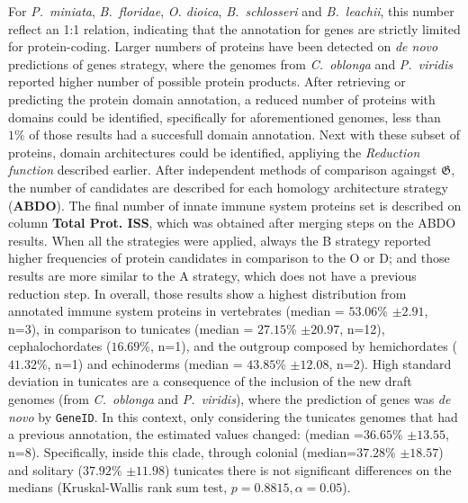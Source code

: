 \documentclass[11pt]{article}
\newcommand{\CAVH}[1]{\begingroup\color{green}#1\endgroup}
\begin{document}
For \textit{P.\ miniata}, \textit{B.\ floridae}, \textit{O. dioica}, 
\textit{B.\ schlosseri} and \textit{B.\ leachii}, this number reflect an 1:1 relation, indicating
that the annotation for genes are strictly limited for protein-coding. Larger numbers of 
proteins have been detected on \textit{de novo} predictions of genes strategy, where the genomes 
from \textit{C.\ oblonga} and \textit{P.\ viridis} reported higher number of possible protein
products. After retrieving or predicting the protein domain annotation, a reduced number of 
proteins with domains could be identified, specifically for aforementioned genomes, less than
$1\%$ of those results had a succesfull domain annotation. Next with these subset of proteins,
domain architectures could be identified, appliying the \textsl{Reduction function} described 
earlier. After independent methods of comparison againgst $\boldsymbol{\mathfrak{G}}$, the 
number of candidates are described for each homology architecture strategy (\textbf{ABDO}).
The final number of innate immune system proteins set is described on column \textbf{Total Prot. 
ISS}, which was obtained after merging steps on the ABDO results. 
When all the strategies were applied, always the B strategy reported higher 
frequencies of protein candidates in comparison to the O or D; and those 
results are more similar to the A strategy, which does not have a previous 
reduction step. In overall, those results show a highest distribution from 
annotated immune system proteins in vertebrates (median = $53.06$\% $\pm 
2.91$, n=3), in comparison to tunicates (median = $27.15$\% $\pm 20.97$, n=12), 
cephalochordates ($16.69$\%, n=1), and the outgroup composed by hemichordates 
($41.32$\%, n=1) and echinoderms (median = $43.85$\% $\pm 12.08$, n=2). High 
standard deviation in tunicates are a consequence of the inclusion of the new 
draft genomes (from \textit{C.\ oblonga} and \textit{P.\ viridis}), where the 
prediction of genes was \textsl{de novo} by \texttt{GeneID}. In this context, 
only considering the tunicates genomes that had a previous annotation, the 
estimated values changed: (median =$36.65$\% $\pm 13.55$, n=8). Specifically,
\CAVH{inside this clade, through colonial (median=$37.28$\% $\pm 18.57$) and solitary 
($37.92$\% $\pm 11.98$) tunicates there is not significant differences on the 
medians (Kruskal-Wallis rank sum test, $p=0.8815, \alpha=0.05$).}
\end{document}
